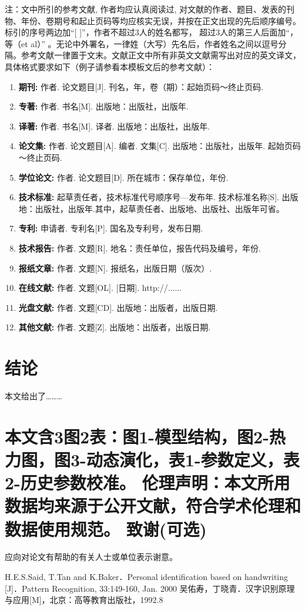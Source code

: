 \documentclass[UTF8]{csoarticle}
\begin{document}
注：文中所引的参考文献, 作者均应认真阅读过, 对文献的作者、题目、发表的刊物、年份、卷期号和起止页码等均应核实无误，并按在正文出现的先后顺序编号。标引的序号两边加“[ ]”，作者不超过3人的姓名都写， 超过3人的第三人后面加“，等（et al）” 。无论中外署名，一律姓（大写）先名后，作者姓名之间以逗号分隔。参考文献一律置于文末。文献正文中所有非英文文献需写出对应的英文译文，具体格式要求如下（例子请参看本模板文后的参考文献）：
\begin{enumerate}
\item\textbf{期刊:}     作者. 论文题目[J]. 刊名，年，卷（期）：起始页码～终止页码.
\item\textbf{专著:}     作者. 书名[M]. 出版地：出版社，出版年.
\item\textbf{译著:}     作者. 书名[M]. 译者. 出版地：出版社，出版年.
\item\textbf{论文集:}   作者. 论文题目[A]. 编者. 文集[C]. 出版地：出版社，出版年. 起始页码～终止页码.
\item\textbf{学位论文:} 作者. 论文题目[D]. 所在城市：保存单位，年份.
\item\textbf{技术标准:} 起草责任者，技术标准代号顺序号—发布年. 技术标准名称[S]. 出版地：出版社，出版年.其中，起草责任者、出版地、出版社、出版年可省。
\item\textbf{专利:}     申请者. 专利名[P]. 国名及专利号，发布日期.
\item\textbf{技术报告:} 作者. 文题[R]. 地名：责任单位，报告代码及编号，年份.
\item\textbf{报纸文章:} 作者. 文题[N]. 报纸名，出版日期（版次）.
\item\textbf{在线文献:} 作者. 文题[OL]. [日期]. http://......
\item\textbf{光盘文献:} 作者. 文题[CD]. 出版地：出版者，出版日期.
\item\textbf{其他文献:} 作者. 文题[Z]. 出版地：出版者，出版日期.
\end{enumerate}

\section{结论}

本文给出了………

\section*{本文含3图2表：图1-模型结构，图2-热力图，图3-动态演化，表1-参数定义，表2-历史参数校准。
伦理声明：本文所用数据均来源于公开文献，符合学术伦理和数据使用规范。
致谢(可选)}

应向对论文有帮助的有关人士或单位表示谢意。



\begin{thebibliography}{2} %
     H.E.S.Said, T.Tan and K.Baker．Personal identification based on handwriting [J]．Pattern Recognition, 33:149-160, Jan. 2000
     吴佑寿，丁晓青．汉字识别原理与应用[M]，北京：高等教育出版社，1992.8
\end{thebibliography}
\end{document}
